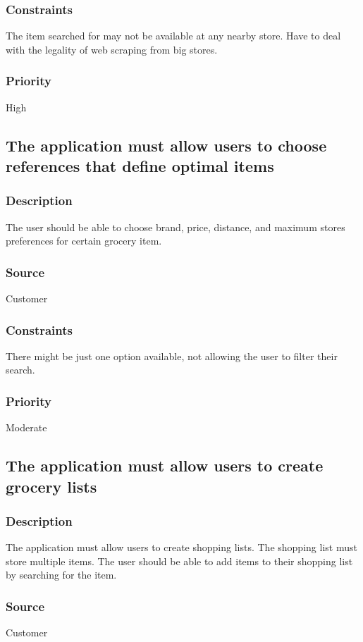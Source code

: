 \subsubsection{Constraints}
The item searched for may not be available at any nearby store. Have to deal with the legality of web scraping from big stores.
\subsubsection{Priority}
High\\

\subsection{The application must allow users to choose references that define optimal items}
\subsubsection{Description}
The user should be able to choose brand, price, distance, and maximum stores preferences for certain grocery item.
\subsubsection{Source}
Customer
\subsubsection{Constraints}
There might be just one option available, not allowing the user to filter their search.
\subsubsection{Priority}
Moderate\\

\subsection{The application must allow users to create grocery lists}
\subsubsection{Description}
The application must allow users to create shopping lists. The shopping list must store multiple items. The user should be able to add items to their shopping list by searching for the item.
\subsubsection{Source}
Customer
